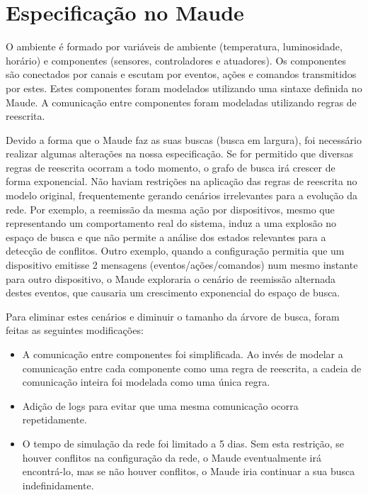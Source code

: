 \section{Especificação no Maude} \label{sec:chap5}

O ambiente é formado por variáveis de ambiente (temperatura, luminosidade, horário) e componentes (sensores, controladores e atuadores). Os componentes são conectados por canais e escutam por eventos, ações e comandos transmitidos por estes. Estes componentes foram modelados utilizando uma sintaxe definida no Maude. A comunicação entre componentes foram modeladas utilizando regras de reescrita.

Devido a forma que o Maude faz as suas buscas (busca em largura), foi necessário realizar algumas alterações na nossa especificação. Se for permitido que diversas regras de reescrita ocorram a todo momento, o grafo de busca irá crescer de forma exponencial.
Não haviam restrições na aplicação das regras de reescrita no modelo original, frequentemente gerando cenários irrelevantes para a evolução da rede. Por exemplo, a reemissão da mesma ação por dispositivos, mesmo que representando um comportamento real do sistema, induz a uma explosão no espaço de busca e que não permite a análise dos estados relevantes para a detecção de conflitos.
Outro exemplo, quando a configuração permitia que um dispositivo emitisse 2 mensagens (eventos/ações/comandos) num mesmo instante para outro dispositivo, o Maude exploraria o cenário de reemissão alternada destes eventos, que causaria um crescimento exponencial do espaço de busca.

Para eliminar estes cenários e diminuir o tamanho da árvore de busca, foram feitas as seguintes modificações:

\begin{itemize}
  \item A comunicação entre componentes foi simplificada. Ao invés de modelar a comunicação entre cada componente como uma regra de reescrita, a cadeia de comunicação inteira foi modelada como uma única regra.
  \item Adição de logs para evitar que uma mesma comunicação ocorra repetidamente.
  \item O tempo de simulação da rede foi limitado a 5 dias. Sem esta restrição, se houver conflitos na configuração da rede, o Maude eventualmente irá encontrá-lo, mas se não houver conflitos, o Maude iria continuar a sua busca indefinidamente.
\end{itemize}

